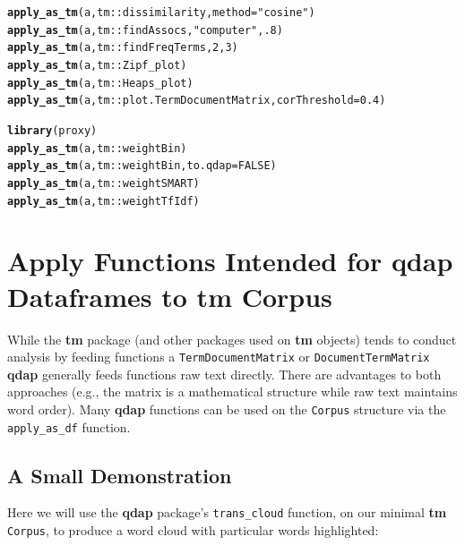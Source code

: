 \documentclass{article}\usepackage[]{graphicx}\usepackage[]{color}
\makeatletter
\newcommand{\hlnum}[1]{\textcolor[rgb]{0.686,0.059,0.569}{#1}}%
\newcommand{\hlstr}[1]{\textcolor[rgb]{0.192,0.494,0.8}{#1}}%
\newcommand{\hlstd}[1]{\textcolor[rgb]{0.345,0.345,0.345}{#1}}%
\newcommand{\hlkwc}[1]{\textcolor[rgb]{0.333,0.667,0.333}{#1}}%
\newcommand{\hlkwd}[1]{\textcolor[rgb]{0.737,0.353,0.396}{\textbf{#1}}}%
\newenvironment{kframe}{%
 \def\at@end@of@kframe{}%
 \ifinner\ifhmode%
  \def\at@end@of@kframe{\end{minipage}}%
  \begin{minipage}{\columnwidth}%
 \fi\fi%
 \def\FrameCommand##1{\hskip\@totalleftmargin \hskip-\fboxsep
 \colorbox{shadecolor}{##1}\hskip-\fboxsep
     \hskip-\linewidth \hskip-\@totalleftmargin \hskip\columnwidth}%
 \MakeFramed {\advance\hsize-\width
   \@totalleftmargin\z@ \linewidth\hsize
   \@setminipage}}%
 {\par\unskip\endMakeFramed%
 \at@end@of@kframe}
\newenvironment{knitrout}{}{} %
\makeatother
\begin{document}
\begin{knitrout}
\color{fgcolor}\begin{kframe}
\begin{alltt}
\hlkwd{apply_as_tm}\hlstd{(a, tm::dissimilarity,} \hlkwc{method} \hlstd{=} \hlstr{"cosine"}\hlstd{)}
\hlkwd{apply_as_tm}\hlstd{(a, tm::findAssocs,} \hlstr{"computer"}\hlstd{,} \hlnum{.8}\hlstd{)}
\hlkwd{apply_as_tm}\hlstd{(a, tm::findFreqTerms,} \hlnum{2}\hlstd{,} \hlnum{3}\hlstd{)}
\hlkwd{apply_as_tm}\hlstd{(a, tm::Zipf_plot)}
\hlkwd{apply_as_tm}\hlstd{(a, tm::Heaps_plot)}
\hlkwd{apply_as_tm}\hlstd{(a, tm::plot.TermDocumentMatrix,} \hlkwc{corThreshold} \hlstd{=} \hlnum{0.4}\hlstd{)}

\hlkwd{library}\hlstd{(proxy)}
\hlkwd{apply_as_tm}\hlstd{(a, tm::weightBin)}
\hlkwd{apply_as_tm}\hlstd{(a, tm::weightBin,} \hlkwc{to.qdap} \hlstd{=} \hlnum{FALSE}\hlstd{)}
\hlkwd{apply_as_tm}\hlstd{(a, tm::weightSMART)}
\hlkwd{apply_as_tm}\hlstd{(a, tm::weightTfIdf)}
\end{alltt}
\end{kframe}
\end{knitrout}


\section{Apply Functions Intended for qdap Dataframes to tm Corpus}

\hspace{.4cm} While the \textbf{tm} package (and other packages used on \textbf{tm} objects) tends to conduct analysis by feeding functions a \texttt{TermDocumentMatrix} or \texttt{DocumentTermMatrix} \textbf{qdap} generally feeds functions raw text directly.  There are advantages to both approaches (e.g., the matrix is a mathematical structure while raw text maintains word order).  Many \textbf{qdap} functions can be used on the \texttt{Corpus} structure via the \texttt{apply\_as\_df} function.    

\subsection{A Small Demonstration}

\hspace{.4cm} Here we will use the \textbf{qdap} package's \texttt{trans\_cloud} function, on our minimal \textbf{tm} \texttt{Corpus}, to produce a word cloud with particular words highlighted:
\end{document}
